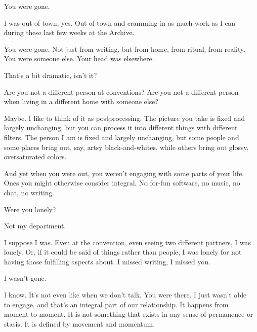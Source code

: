 \label{ally:25}
\begin{paracol}{2}
  \begin{leftcolumn}

\begin{ally}
You were gone.
\end{ally}
I was out of town, yes. Out of town and cramming in as much work as I can during these last few weeks at the Archive.

\begin{ally}
You were gone. Not just from writing, but from home, from ritual, from reality. You were someone else. Your head was elsewhere.
\end{ally}
That's a bit dramatic, isn't it?

\begin{ally}
Are you not a different person at conventions? Are you not a different person when living in a different home with someone else?
\end{ally}
Maybe. I like to think of it as postprocessing. The picture you take is fixed and largely unchanging, but you can process it into different things with different filters. The person I am is fixed and largely unchanging, but some people and some places bring out, say, artsy black-and-whites, while others bring out glossy, oversaturated colors.

\begin{ally}
And yet when you were out, you weren't engaging with some parts of your life. Ones you might otherwise consider integral. No for-fun software, no music, no chat, no writing.
\end{ally}
Were you lonely?

\begin{ally}
Not my department.
\end{ally}
I suppose I was. Even at the convention, even seeing two different partners, I was lonely. Or, if it could be said of things rather than people, I was lonely for not having those fulfilling aspects about. I missed writing, I missed you.

\begin{ally}
I wasn't gone.
\end{ally}
I know. It's not even like when we don't talk. You were there. I just wasn't able to engage, and that's an integral part of our relationship. It happens from moment to moment. It is not something that exists in any sense of permanence or stasis. It is defined by movement and momentum.
\newpage
\end{leftcolumn}
\end{paracol}
